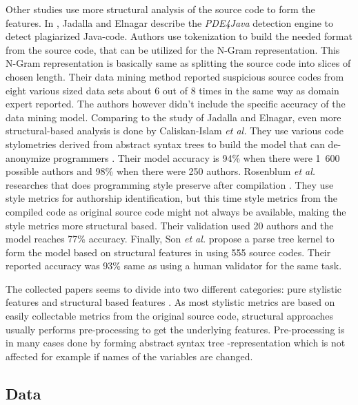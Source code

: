 \documentclass[english]{tktltiki2}
\theoremstyle{definition}
\theoremstyle{remark}
\begin{document}
Other studies use more structural analysis of the source code to form the features. In \cite{jadalla2008pde4java}, Jadalla and Elnagar describe the \textit{PDE4Java} detection engine to detect plagiarized Java-code. Authors use tokenization to build the needed format from the source code, that can be utilized for the N-Gram representation. This N-Gram representation is basically same as splitting the source code into slices of chosen length. Their data mining method reported suspicious source codes from eight various sized data sets about 6 out of 8 times in the same way as domain expert reported. The authors however didn't include the specific accuracy of the data mining model. Comparing to the study of Jadalla and Elnagar, even more structural-based analysis is done by Caliskan-Islam \textit{et al.} They use various code stylometries derived from abstract syntax trees to build the model that can de-anonymize programmers \cite{caliskan2015anonymizing}. Their model accuracy is 94\% when there were 1\ 600 possible authors and 98\% when there were 250 authors. Rosenblum \textit{et al.} researches that does programming style preserve after compilation \cite{rosenblum2011wrote}. They use style metrics for authorship identification, but this time style metrics from the compiled code as original source code might not always be available, making the style metrics more structural based. Their validation used 20 authors and the model reaches 77\% accuracy. Finally, Son \textit{et al.} propose a parse tree kernel to form the model based on structural features in \cite{Son:2013:APS:2508269.2508323} using 555 source codes. Their reported accuracy was 93\% same as using a human validator for the same task.

The collected papers seems to divide into two different categories: pure stylistic features \cite{bandara2011machine, lange2007using, kothari2007probabilistic, Elenbogen:2008:DOS:1295109.1295123} and structural based features \cite{jadalla2008pde4java,caliskan2015anonymizing,rosenblum2011wrote, Son:2013:APS:2508269.2508323}. As most stylistic metrics are based on easily collectable metrics from the original source code, structural approaches usually performs pre-processing to get the underlying features. Pre-processing is in many cases done by forming abstract syntax tree -representation which is not affected for example if names of the variables are changed.  


\subsection{Data}
\end{document}
